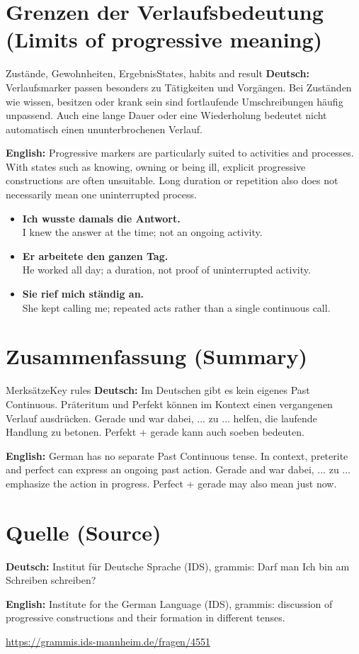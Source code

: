 \documentclass[a4paper,11pt]{article}
\newcommand{\GermanText}[1]{\textbf{Deutsch: }#1\par}
\newcommand{\EnglishText}[1]{{\small\color{SoftGray}\textbf{English: }#1\par}}
\newcommand{\ExampleItem}[2]{\item \textbf{#1}\\{\small\color{SoftGray}#2}}
\begin{document}
\section{Grenzen der Verlaufsbedeutung \textnormal{(Limits of progressive meaning)}}
\begin{grammarentry}{Zustände, Gewohnheiten, Ergebnis}{States, habits and result}
\GermanText{Verlaufsmarker passen besonders zu Tätigkeiten und Vorgängen. Bei Zuständen wie wissen, besitzen oder krank sein sind fortlaufende Umschreibungen häufig unpassend. Auch eine lange Dauer oder eine Wiederholung bedeutet nicht automatisch einen ununterbrochenen Verlauf.}
\EnglishText{Progressive markers are particularly suited to activities and processes. With states such as knowing, owning or being ill, explicit progressive constructions are often unsuitable. Long duration or repetition also does not necessarily mean one uninterrupted process.}
\end{grammarentry}
\begin{exbox}
\begin{itemize}
\ExampleItem{Ich wusste damals die Antwort.}{I knew the answer at the time; not an ongoing activity.}
\ExampleItem{Er arbeitete den ganzen Tag.}{He worked all day; a duration, not proof of uninterrupted activity.}
\ExampleItem{Sie rief mich ständig an.}{She kept calling me; repeated acts rather than a single continuous call.}
\end{itemize}
\end{exbox}

\section{Zusammenfassung \textnormal{(Summary)}}
\begin{grammarentry}{Merksätze}{Key rules}
\GermanText{Im Deutschen gibt es kein eigenes Past Continuous. Präteritum und Perfekt können im Kontext einen vergangenen Verlauf ausdrücken. Gerade und war dabei, ... zu ... helfen, die laufende Handlung zu betonen. Perfekt + gerade kann auch soeben bedeuten.}
\EnglishText{German has no separate Past Continuous tense. In context, preterite and perfect can express an ongoing past action. Gerade and war dabei, ... zu ... emphasize the action in progress. Perfect + gerade may also mean just now.}
\end{grammarentry}

\section{Quelle \textnormal{(Source)}}
        \GermanText{Institut für Deutsche Sprache (IDS), grammis: Darf man Ich bin am Schreiben schreiben?}
        \EnglishText{Institute for the German Language (IDS), grammis: discussion of progressive constructions and their formation in different tenses.}
        \url{https://grammis.ids-mannheim.de/fragen/4551}
\end{document}
